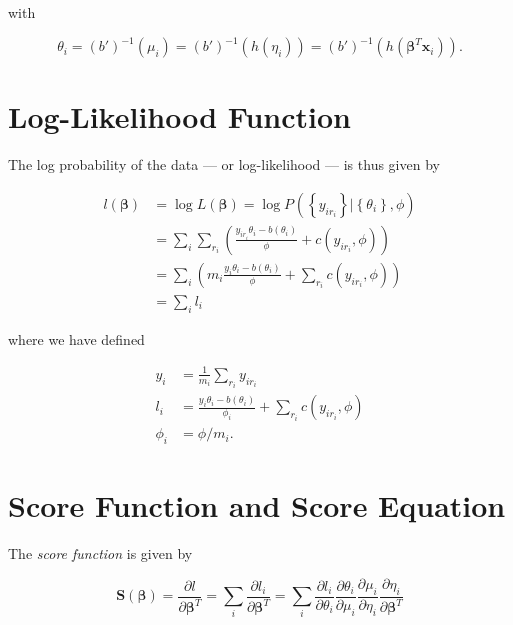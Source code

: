 \documentclass[
  12pt,
]{book}
\begin{document}
with

\begin{equation}
  \theta_{i}
  = (b')^{-1}(\mu_{i})
  = (b')^{-1}(h(\eta_{i}))
  = (b')^{-1}(h(\boldsymbol{\beta}^{T}\boldsymbol{x}_{i})).
\end{equation}

\section{Log-Likelihood Function}\label{loglike}

The log probability of the data --- or log-likelihood --- is thus given by

\begin{align}
  l(\boldsymbol{\beta})
  & = \log L(\boldsymbol{\beta}) = \log P_{}\left(\left\{y_{ir_{i}}\right\} |\left\{\theta_{i}\right\}, \phi\right) \\
  & = \sum_{i} \sum_{r_{i}} \left( \frac{y_{ir_{i}}\theta_{i} - b(\theta_{i})}{\phi} + c(y_{ir_{i}}, \phi) \right) \\
  & = \sum_{i} \left( m_{i} \frac{y_{i}\theta_{i} - b(\theta_{i})}{\phi} + \sum_{r_{i}} c(y_{ir_{i}}, \phi) \right) \\
  & = \sum_{i} l_{i}
\end{align}

where we have defined

\begin{align}
  y_i &= \frac{1}{m_i} \sum_{r_{i}} y_{ir_{i}} \\
  l_i &= \frac{y_{i}\theta_{i} - b(\theta_{i})}{\phi_i} + \sum_{r_{i}} c(y_{ir_{i}}, \phi) \\
  \phi_i &= \phi/m_i.
\end{align}

\section{Score Function and Score Equation}\label{score-function-and-score-equation}

The \emph{score function} is given by

\begin{equation}
  \boldsymbol{S}(\boldsymbol{\beta})
  = \frac{\partial l}{\partial \boldsymbol{\beta}^{T}}
  = \sum_{i} \frac{\partial l_{i}}{\partial \boldsymbol{\beta}^{T}}
  = \sum_{i} \frac{\partial l_{i}}{\partial \theta_{i}} 
             \frac{\partial \theta_{i}}{\partial \mu_{i}}
             \frac{\partial \mu_{i}}{\partial \eta_{i}}
             \frac{\partial \eta_{i}}{\partial \boldsymbol{\beta}^{T}}
  \label{eq:scorefunction}
\end{equation}
\end{document}
